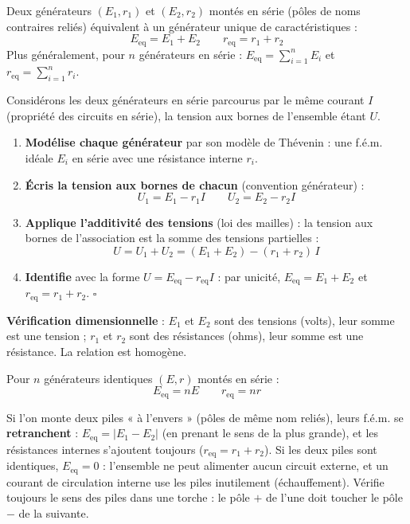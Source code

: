 \documentclass[11pt]{article}
\begin{document}
\begin{propriete}
Deux générateurs $(E_1, r_1)$ et $(E_2, r_2)$ montés en série (pôles de noms contraires reliés) équivalent à un générateur unique de caractéristiques :
\[ \boxed{E_{\text{eq}} = E_1 + E_2} \qquad \boxed{r_{\text{eq}} = r_1 + r_2} \]
Plus généralement, pour $n$ générateurs en série : $E_{\text{eq}} = \sum_{i=1}^n E_i$ et $r_{\text{eq}} = \sum_{i=1}^n r_i$.
\end{propriete}

\begin{experience}
Considérons les deux générateurs en série parcourus par le même courant $I$ (propriété des circuits en série), la tension aux bornes de l'ensemble étant $U$.
\begin{enumerate}
\item \textbf{Modélise chaque générateur} par son modèle de Thévenin : une f.é.m. idéale $E_i$ en série avec une résistance interne $r_i$.
\item \textbf{Écris la tension aux bornes de chacun} (convention générateur) :
\[ U_1 = E_1 - r_1 I \qquad U_2 = E_2 - r_2 I \]
\item \textbf{Applique l'additivité des tensions} (loi des mailles) : la tension aux bornes de l'association est la somme des tensions partielles :
\[ U = U_1 + U_2 = (E_1 + E_2) - (r_1 + r_2)\, I \]
\item \textbf{Identifie} avec la forme $U = E_{\text{eq}} - r_{\text{eq}} I$ : par unicité, $E_{\text{eq}} = E_1 + E_2$ et $r_{\text{eq}} = r_1 + r_2$. $\square$
\end{enumerate}
\textbf{Vérification dimensionnelle} : $E_1$ et $E_2$ sont des tensions (volts), leur somme est une tension ; $r_1$ et $r_2$ sont des résistances (ohms), leur somme est une résistance. La relation est homogène.
\end{experience}

\begin{propriete}
Pour $n$ générateurs identiques $(E, r)$ montés en série :
\[ E_{\text{eq}} = nE \qquad r_{\text{eq}} = nr \]
\end{propriete}

\begin{attention}
Si l'on monte deux piles « à l'envers » (pôles de même nom reliés), leurs f.é.m. se \textbf{retranchent} : $E_{\text{eq}} = |E_1 - E_2|$ (en prenant le sens de la plus grande), et les résistances internes s'ajoutent toujours ($r_{\text{eq}} = r_1 + r_2$). Si les deux piles sont identiques, $E_{\text{eq}} = 0$ : l'ensemble ne peut alimenter aucun circuit externe, et un courant de circulation interne use les piles inutilement (échauffement). Vérifie toujours le sens des piles dans une torche : le pôle $+$ de l'une doit toucher le pôle $-$ de la suivante.
\end{attention}
\end{document}
